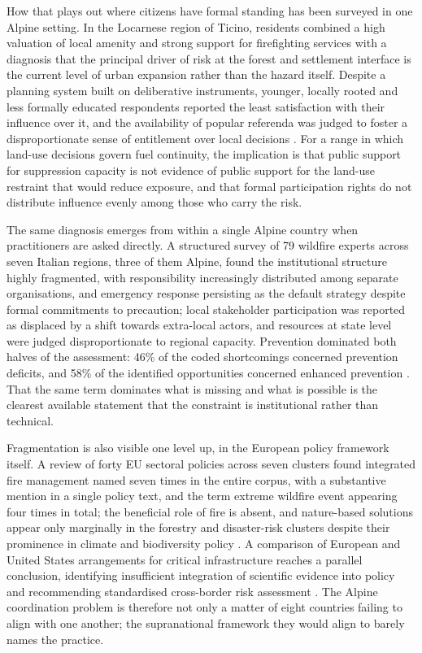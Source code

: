 \documentclass[11pt,a4paper]{article}
\begin{document}
How that plays out where citizens have formal standing has been surveyed in one Alpine setting. In the Locarnese region of Ticino, residents combined a high valuation of local amenity and strong support for firefighting services with a diagnosis that the principal driver of risk at the forest and settlement interface is the current level of urban expansion rather than the hazard itself. Despite a planning system built on deliberative instruments, younger, locally rooted and less formally educated respondents reported the least satisfaction with their influence over it, and the availability of popular referenda was judged to foster a disproportionate sense of entitlement over local decisions \citep{bardsley_wildfire_2021}. For a range in which land-use decisions govern fuel continuity, the implication is that public support for suppression capacity is not evidence of public support for the land-use restraint that would reduce exposure, and that formal participation rights do not distribute influence evenly among those who carry the risk.

The same diagnosis emerges from within a single Alpine country when practitioners are asked directly. A structured survey of 79 wildfire experts across seven Italian regions, three of them Alpine, found the institutional structure highly fragmented, with responsibility increasingly distributed among separate organisations, and emergency response persisting as the default strategy despite formal commitments to precaution; local stakeholder participation was reported as displaced by a shift towards extra-local actors, and resources at state level were judged disproportionate to regional capacity. Prevention dominated both halves of the assessment: 46\% of the coded shortcomings concerned prevention deficits, and 58\% of the identified opportunities concerned enhanced prevention \citep{kirschner_governance_2024}. That the same term dominates what is missing and what is possible is the clearest available statement that the constraint is institutional rather than technical.

Fragmentation is also visible one level up, in the European policy framework itself. A review of forty EU sectoral policies across seven clusters found integrated fire management named seven times in the entire corpus, with a substantive mention in a single policy text, and the term extreme wildfire event appearing four times in total; the beneficial role of fire is absent, and nature-based solutions appear only marginally in the forestry and disaster-risk clusters despite their prominence in climate and biodiversity policy \citep{plana_framing_2024}. A comparison of European and United States arrangements for critical infrastructure reaches a parallel conclusion, identifying insufficient integration of scientific evidence into policy and recommending standardised cross-border risk assessment \citep{kalapodis_towards_2025}. The Alpine coordination problem is therefore not only a matter of eight countries failing to align with one another; the supranational framework they would align to barely names the practice.
\end{document}

